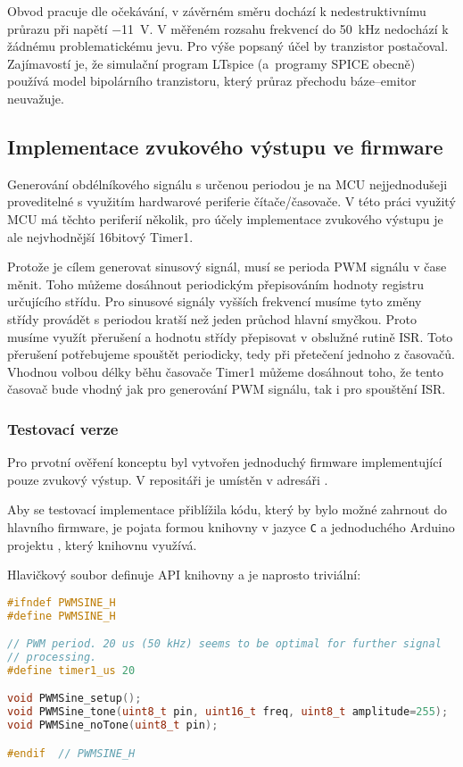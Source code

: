 Obvod pracuje dle očekávání, v závěrném směru dochází k nedestruktivnímu
průrazu při napětí \SI{-11}{\volt}. V měřeném rozsahu frekvencí do
\SI{50}{\kilo\hertz} nedochází k žádnému problematickému jevu. Pro výše popsaný
účel by tranzistor postačoval. Zajímavostí je, že simulační program LTspice
(a~programy SPICE obecně) používá model bipolárního tranzistoru, který průraz
přechodu báze--emitor neuvažuje.



\FloatBarrier  %
\subsection{Implementace zvukového výstupu ve firmware}
Generování obdélníkového signálu s určenou periodou je na MCU nejjednodušeji
proveditelné s využitím hardwarové periferie čítače/časovače. V této práci
využitý MCU má těchto periferií několik, pro účely implementace zvukového
výstupu je ale nejvhodnější 16bitový Timer1.

Protože je cílem generovat sinusový signál, musí se perioda PWM signálu v čase
měnit. Toho můžeme dosáhnout periodickým přepisováním hodnoty registru
určujícího střídu. Pro sinusové signály vyšších frekvencí musíme tyto změny
střídy provádět s periodou kratší než jeden průchod hlavní smyčkou. Proto
musíme využít přerušení a hodnotu střídy přepisovat v obslužné rutině ISR.
Toto přerušení potřebujeme spouštět periodicky, tedy při přetečení jednoho
z časovačů. Vhodnou volbou délky běhu časovače Timer1 můžeme dosáhnout toho, že
tento časovač bude vhodný jak pro generování PWM signálu, tak i pro spouštění
ISR.

\subsubsection{Testovací verze}
Pro prvotní ověření konceptu byl vytvořen jednoduchý firmware implementující
pouze zvukový výstup. V repositáři  je umístěn v adresáři
.  %

Aby se testovací implementace přiblížila kódu, který by bylo možné zahrnout do
hlavního firmware, je pojata formou knihovny v jazyce \texttt{C} a jednoduchého
Arduino projektu , který knihovnu využívá.

Hlavičkový soubor  definuje API knihovny a je naprosto
triviální:
\begin{lstlisting}[language=C++,style=numbers]
#ifndef PWMSINE_H
#define PWMSINE_H

// PWM period. 20 us (50 kHz) seems to be optimal for further signal
// processing.
#define timer1_us 20

void PWMSine_setup();
void PWMSine_tone(uint8_t pin, uint16_t freq, uint8_t amplitude=255);
void PWMSine_noTone(uint8_t pin);

#endif  // PWMSINE_H
\end{lstlisting}

